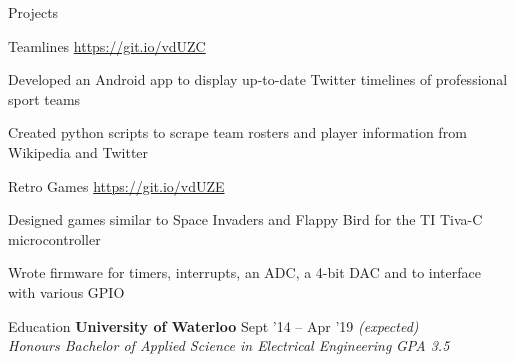 \documentclass{resume} %
\begin{document}
	
	\begin{rSection}{Projects}
		\begin{rSubsection}{Teamlines}
			{\href{https://git.io/vdUZC}{https://git.io/vdUZC}}
			{}{}
			
			\item Developed an Android app to display up-to-date Twitter timelines of professional sport teams
			\item Created python scripts to scrape team rosters and player information from Wikipedia and Twitter
		\end{rSubsection}
		\begin{rSubsection}{Retro Games}
			{\href{https://git.io/vdUZE}{https://git.io/vdUZE}}
			{}{}
		
			\item Designed games similar to Space Invaders and Flappy Bird for the TI Tiva-C microcontroller
			\item Wrote firmware for timers, interrupts, an ADC, a 4-bit DAC and to interface with various GPIO
		\end{rSubsection}
	\end{rSection}
	
	
	\begin{rSection}{Education}
		{\bf University of Waterloo} \hfill {Sept '14 -- Apr '19 \em (expected)} \\
		{\em Honours Bachelor of Applied Science in Electrical Engineering} \hfill {\em GPA 3.5}
		\vspace{0.5em}
	\end{rSection}
	
\end{document}
